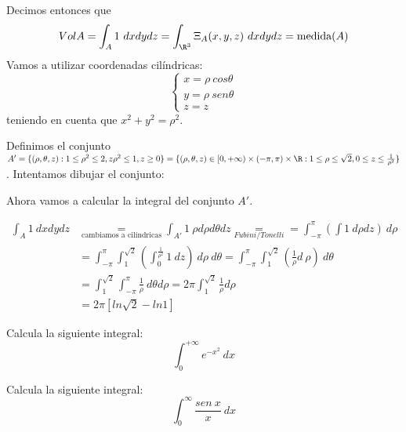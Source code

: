 \begin{sol}
    Decimos entonces que \begin{align*}
        \label{}
        Vol A = \int_A 1 \ dxdydz = \int_{\R^3} \Xi_A (x,y,z) \ dxdydz = \text{medida}(A)
    \end{align*}
    Vamos a utilizar coordenadas cilíndricas:
    $$\begin{cases}
        x = \rho \ cos \theta \\
        y = \rho \ sen \theta \\
        z = z
    \end{cases}$$ teniendo en cuenta que  $x^2 + y^2 = \rho^2$.

    Definimos el conjunto $A' = \{(\rho, \theta, z) : 1 \leq \rho^2 \leq 2, z\rho^2 \leq 1, z \geq 0 \} = \{ (\rho, \theta, z) \in [0, +\infty) \times (-\pi, \pi) \times \R : 1 \leq \rho \leq \sqrt{2}, 0 \leq z \leq \frac{1}{\rho^2} \}$. Intentamos dibujar el conjunto:

    Ahora vamos a calcular la integral del conjunto $A'$.

    \begin{align*}
        \label{}
        \int_A 1 \ dxdydz &\underset{\text{cambiamos a cilíndricas}}{=} \int_{A'} 1 \ \rho d\rho d\theta dz \underset{Fubini/Tonelli}{=} = \int_{-\pi}^{\pi}\left( \int 1 \ d\rho dz \right) \ d\rho \\
                          &= \int_{-\pi}^{\pi} \int_1^{\sqrt{2}} \left( \int_0^{\frac{1}{\rho^2}} 1 \ dz \right) \ d\rho \ d\theta = \int_{-\pi}^{\pi} \int_1^{\sqrt{2}} \left( \frac{1}{\rho} d \ \rho \right) \ d\theta \\
                          &= \int_1^{\sqrt{2}} \int_{-\pi}^{\pi} \frac{1}{\rho} \ d \theta d \rho = 2\pi \int_1^{\sqrt{2}} \frac{1}{\rho} d\rho \\
                          &= 2\pi [ln \sqrt{2} - ln 1]
    \end{align*}

\end{sol}

    \begin{ejer}
        Calcula la siguiente integral: $$\int_0^{+\infty} e^{-x^2} \ dx$$
    \end{ejer}

    \begin{ejer}
        Calcula la siguiente integral: $$\int_0^{\infty} \frac{sen \ x}{x} \ dx$$
    \end{ejer}

